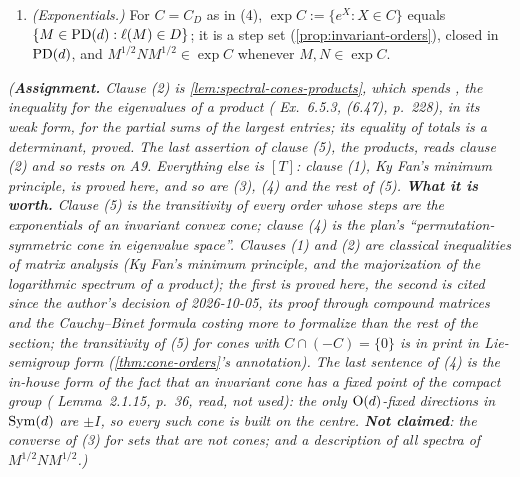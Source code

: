 \begin{lemma}
\begin{enumerate}
$C \cap (-C) = \{0\}$ if and only if $D \cap (-D) = \{0\}$. If moreover $C \ne \{0\}$ and
$C \cap (-C) = \{0\}$, then exactly one of $I$ and $-I$ lies in $C$, and $\tr X$ has that sign for
every $X \in C \setminus \{0\}$.
\item \emph{(Exponentials.)} For $C = C_D$ as in (4), $\exp C := \{e^X : X \in C\}$ equals
$\{M \in \mathrm{PD}(d) : \ell(M) \in D\}$; it is a step set (\ref{prop:invariant-orders}), closed in $\mathrm{PD}(d)$,
and $M^{1/2}NM^{1/2} \in \exp C$ whenever $M, N \in \exp C$.
\end{enumerate}
\statusA\quad{}\quad\emph{(\textbf{Assignment.} Clause (2) is
\ref{lem:spectral-cones-products}, which spends , the inequality for the eigenvalues of a
product ( Ex.~6.5.3, (6.47), p.~228), in its weak form, for the partial sums of
the largest entries; its equality of totals is a determinant, proved. The last assertion of clause (5), the
products, reads clause (2) and so rests on A9. Everything else is $[T]$: clause (1), Ky Fan's minimum
principle, is proved here, and so are (3), (4) and the rest of (5). \textbf{What it is worth.} Clause (5)
is the transitivity of every order whose steps are the exponentials of an invariant convex cone; clause (4)
is the plan's ``permutation-symmetric cone in eigenvalue space''. Clauses (1) and (2) are classical
inequalities of matrix analysis (Ky Fan's minimum principle, and the majorization of the logarithmic
spectrum of a product); the first is proved here, the second is cited since the author's decision of
2026-10-05, its proof through compound matrices and the Cauchy--Binet formula costing more to formalize
than the rest of the section; the transitivity of (5) for cones with $C \cap (-C) = \{0\}$ is in
print in Lie-semigroup form (\ref{thm:cone-orders}'s annotation). The last sentence of (4) is the
in-house form of the fact that an invariant cone has a fixed point of the compact group
( Lemma~2.1.15, p.~36, read, not used): the only $\mathrm{O}(d)$-fixed directions in
$\mathrm{Sym}(d)$ are $\pm I$, so every such cone is built on the centre. \textbf{Not claimed}: the converse of
(3) for sets that are not cones; and a description of all spectra of $M^{1/2}NM^{1/2}$.)}
\end{lemma}

